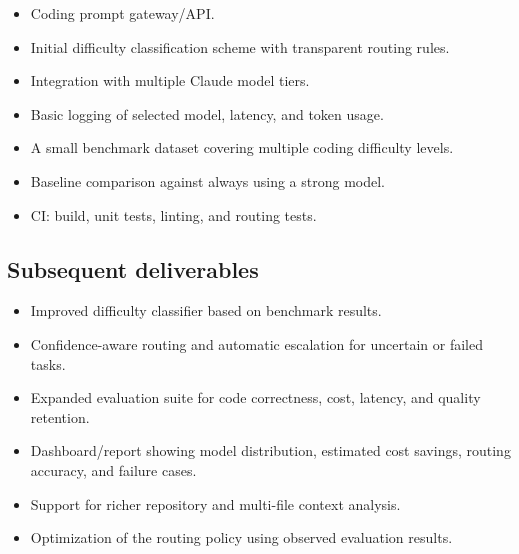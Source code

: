 \documentclass[11pt,a4paper]{article}
\begin{document}
\begin{itemize}[leftmargin=0.7cm]

    \item Coding prompt gateway/API.

    \item Initial difficulty classification scheme with
    transparent routing rules.

    \item Integration with multiple Claude model tiers.

    \item Basic logging of selected model, latency, and
    token usage.

    \item A small benchmark dataset covering multiple coding
    difficulty levels.

    \item Baseline comparison against always using a strong
    model.

    \item CI: build, unit tests, linting, and routing tests.

\end{itemize}

\subsection{Subsequent deliverables}

\begin{itemize}[leftmargin=0.7cm]

    \item Improved difficulty classifier based on benchmark
    results.

    \item Confidence-aware routing and automatic escalation
    for uncertain or failed tasks.

    \item Expanded evaluation suite for code correctness,
    cost, latency, and quality retention.

    \item Dashboard/report showing model distribution,
    estimated cost savings, routing accuracy, and failure
    cases.

    \item Support for richer repository and multi-file
    context analysis.

    \item Optimization of the routing policy using observed
    evaluation results.

\end{itemize}
\end{document}
